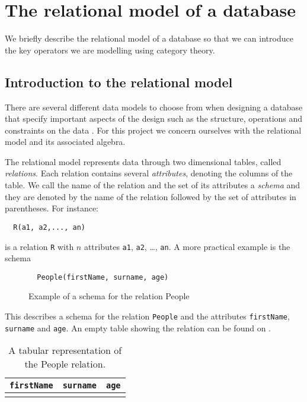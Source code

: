 \section{The relational model of a database}
We briefly describe the relational model of a database so that we can introduce the key operators we are modelling using category theory. 
\subsection{Introduction to the relational model}
There are several different data models to choose from when designing a database that specify important aspects of the design such as the structure, operations and constraints on the data \cite{DatabaseSystems}. For this project we concern ourselves with the relational model and its associated algebra.

The relational model represents data through two dimensional tables, called \emph{relations}. Each relation contains several \emph{attributes}, denoting the columns of the table. We call the name of the relation and the set of its attributes a \emph{schema} and they are denoted by the name of the relation followed by the set of attributes in parentheses.\cite{DatabaseSystems} For instance: 
\begin{center}
\begin{verbatim}
  R(a1, a2,..., an)
\end{verbatim}
\end{center}
is a relation \verb|R| with $n$ attributes \verb|a1|, \verb|a2|, \ldots, \verb|an|. A more practical example is the schema
\begin{figure}[!h]
\begin{verbatim}
  People(firstName, surname, age)
\end{verbatim}
\caption[Schema for the People relation]{Example of a schema for the relation People}
\label{fig:peopleSchema}
\end{figure}
This describes a schema for the relation \verb|People| and the attributes \verb|firstName|, \verb|surname| and \verb|age|.
An empty table showing the relation can be found on .
\begin{table}[h]
  \centering
  \begin{tabular}{l|l|l}
    \verb|firstName| & \verb|surname| & \verb|age| \\
    \hline\hline
    & &\\
  \end{tabular}
  \caption{A tabular representation of the People relation.}
  \label{tab:peopleRelationHeadings}
\end{table}

